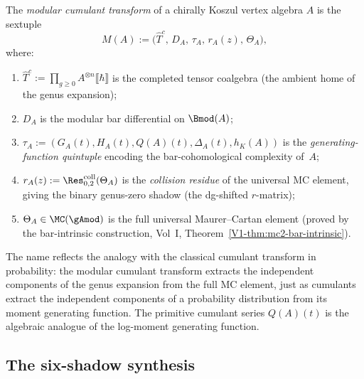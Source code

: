 \begin{definition}
The \emph{modular cumulant transform} of a chirally Koszul vertex
algebra $A$ is the sextuple
\begin{equation}%
M(A)
:=
\bigl(\widehat{T}^c,\, D_A,\, \tau_A,\, r_A(z),\, \Theta_A\bigr),
\end{equation}
where:
\begin{enumerate}[leftmargin=2.4em]
\item $\widehat{T}^c := \prod_{g \ge 0} A^{\otimes n} \llbracket\hbar\rrbracket$
is the completed tensor coalgebra (the ambient home of the genus expansion);

\item $D_A$ is the modular bar differential on $\Bmod(A)$;

\item $\tau_A := (G_A(t), H_A(t), Q(A)(t), \Delta_A(t), h_K(A))$
is the \emph{generating-function quintuple} encoding the bar-cohomological
complexity of~$A$;

\item $r_A(z) := \Res^{\mathrm{coll}}_{0,2}(\Theta_A)$ is the
\emph{collision residue} of the universal MC element, giving the binary
genus-zero shadow (the dg-shifted $r$-matrix);

\item $\Theta_A \in \MC(\gAmod)$ is the full universal Maurer--Cartan
element (proved by the bar-intrinsic construction,
Vol~I, Theorem~\ref*{V1-thm:mc2-bar-intrinsic}).
\end{enumerate}
\end{definition}

\begin{remark}
The name reflects the analogy with the classical cumulant transform in
probability: the modular cumulant transform extracts the independent
components of the genus expansion from the full MC element, just as
cumulants extract the independent components of a probability distribution
from its moment generating function. The primitive cumulant series
$Q(A)(t)$ is the algebraic analogue of the log-moment generating function.
\end{remark}

\subsection{The six-shadow synthesis}

